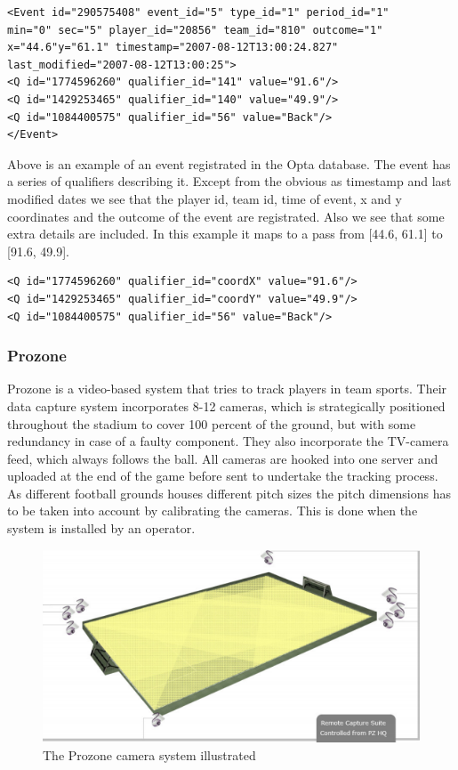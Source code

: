 \begin{lstlisting}
<Event id="290575408" event_id="5" type_id="1" period_id="1" 
min="0" sec="5" player_id="20856" team_id="810" outcome="1" 
x="44.6"y="61.1" timestamp="2007-08-12T13:00:24.827" 
last_modified="2007-08-12T13:00:25">
<Q id="1774596260" qualifier_id="141" value="91.6"/>
<Q id="1429253465" qualifier_id="140" value="49.9"/>
<Q id="1084400575" qualifier_id="56" value="Back"/>
</Event>
\end{lstlisting}

Above is an example of an event registrated in the Opta database. The event has a series of qualifiers describing it. Except from the obvious as timestamp and last modified dates we see that the player id, team id, time of event, x and y coordinates and the outcome of the event are registrated. Also we see that some extra details are included. In this example it maps to a pass from [44.6, 61.1] to [91.6, 49.9]. 

\begin{lstlisting}
<Q id="1774596260" qualifier_id="coordX" value="91.6"/>
<Q id="1429253465" qualifier_id="coordY" value="49.9"/>
<Q id="1084400575" qualifier_id="56" value="Back"/>
\end{lstlisting}

\subsubsection{Prozone}
Prozone is a video-based system that tries to track players in team sports. Their data capture system incorporates 8-12 cameras, which is strategically positioned throughout the stadium to cover 100 percent of the ground, but with some redundancy in case of a faulty component. They also incorporate the TV-camera feed, which always follows the ball. All cameras are hooked into one server and uploaded at the end of the game before sent to undertake the tracking process. As different football grounds houses different pitch sizes the pitch dimensions has to be taken into account by calibrating the cameras. This is done when the system is installed by an operator. 

\begin{figure}[ht!]
\centering
\includegraphics[width=150mm]{images/general/prozonecam.png}
\caption{The Prozone camera system illustrated}
\label{overflow}
\end{figure}

